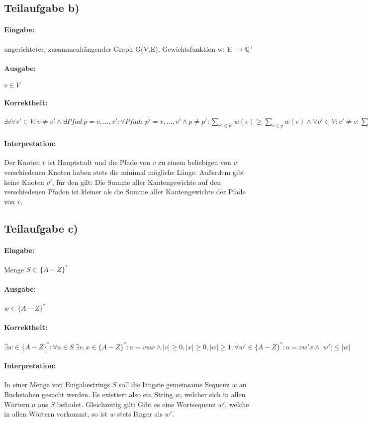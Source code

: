 \documentclass[12pt]{scrartcl}%
\theoremstyle{nonumberplain}
\newcommand{\Q}{\mathbb{Q}}
\begin{document}
\subsection*{Teilaufgabe b)}

\paragraph{Eingabe:} ungerichteter, zusammenhängender Graph G(V,E), Gewichtsfunktion w: E $\rightarrow \Q ^+$
\paragraph{Ausgabe:} $v \in V$
\paragraph{Korrektheit:} $\exists v \forall v' \in V: v \not= v' \wedge \exists Pfad \ p = v,...,v': \forall Pfade \ p' = v,...,v' \wedge p \not= p':  \sum_{e' \in p'}^{}w(e) \ge \sum_{e \in p}^{}w(e) \wedge \forall v' \in V: v' \not= v : \sum_{p_v  \in P_v}{w(p_v)} < \sum_{p_{v'} \in P_{v'}}{w(p_{v'})}$

\paragraph{Interpretation:}
Der Knoten $v$ ist Hauptstadt und die Pfade von $v$ zu einem beliebigen von $v$ verschiedenen Knoten haben stets die minimal mögliche Länge. Außerdem gibt keine Knoten $v'$, für den gilt: Die Summe aller Kantengewichte auf den verschiedenen Pfaden ist kleiner als die Summe aller Kantengewichte der Pfade von $v$.

\subsection*{Teilaufgabe c)}

\paragraph{Eingabe:} Menge $S \subset \{A-Z\}^*$
\paragraph{Ausgabe:} $w \in \{A-Z\}^*$
\paragraph{Korrektheit:} $\exists w \in \{A-Z\}^*: \forall a \in S \ \exists v,x \in \{A-Z\}^*: a = vwx \wedge |v| \ge 0, |x| \ge 0, |w| \ge 1: \forall w' \in \{A-Z\}^*: a = vw'x \wedge  |w'| \le |w|$
\paragraph{Interpretation:}
In einer Menge von Eingabestrings $S$ soll die längste gemeinsame Sequenz $w$ an Buchstaben gesucht werden. Es existiert also ein String $w$, welcher sich in allen Wörtern $a$ aus $S$ befindet. Gleichzeitig gilt: Gibt es eine Wortsequenz $w'$, welche in allen Wörtern vorkommt, so ist $w$ stets länger als $w'$.
\end{document}
